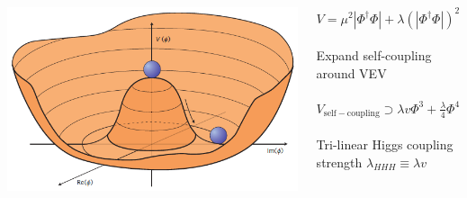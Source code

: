 \documentclass{beamer}
\newcommand*{\header}[1]{\fontsize{16}{8}\selectfont \textbf{{\color{MyPurple}{#1}}}}
\begin{document}
\begin{frame}
\begin{columns}
\begin{column}{0.5\textwidth}
\begin{center}
\end{center}
\end{column}
\end{columns}
\end{frame}

\begin{frame}
\begin{center}
\header{Higgs Self-Coupling}
\end{center}
\begin{columns}
\begin{column}{0.5\textwidth}
\includegraphics[width=1\textwidth]{figures/higgspotential}
\end{column}
\begin{column}{0.5\textwidth}
\color{MyPurple}{Higgs Potential}\color{black}
\begin{center}
$V = \mu^2|\Phi^{\dagger}\Phi| + \lambda(|\Phi^{\dagger}\Phi|)^2$\\~\\
Expand self-coupling around VEV\\~\\
$V_\mathrm{self-coupling} \supset{} \lambda{}v\Phi^3 + \frac{\lambda}{4}\Phi^4$\\~\\
Tri-linear Higgs coupling strength $\lambda_{HHH}\equiv{}\lambda v$
\end{center}
\end{column}
\end{columns}
\end{frame}
\end{document}
